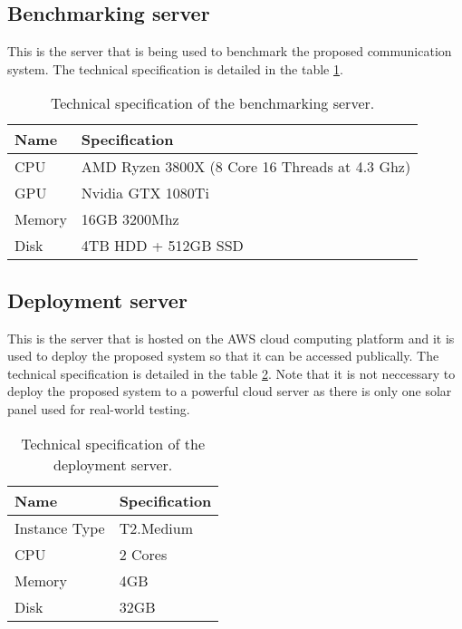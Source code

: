 \documentclass[../thesis.tex]{subfiles}
\begin{document}
\subsection{Benchmarking server}
\label{sec:benchmarkingServer}

This is the server that is being used to benchmark the proposed communication system. The technical specification is detailed in the table \ref{tab:benchmarkingHardware}.

\begin{table}[h!]
	\begin{center}
		\caption{Technical specification of the benchmarking server.}
		\label{tab:benchmarkingHardware}
		\begin{tabular}{l|l}
			\toprule
			\textbf{Name} & \textbf{Specification}\\
			\midrule
			CPU & AMD Ryzen 3800X (8 Core 16 Threads at 4.3 Ghz)\\
			GPU & Nvidia GTX 1080Ti\\
			Memory & 16GB 3200Mhz\\
			Disk & 4TB HDD + 512GB SSD\\
			\bottomrule
		\end{tabular}
	\end{center}
\end{table}

\subsection{Deployment server}

This is the server that is hosted on the AWS cloud computing platform and it is used to deploy the proposed system so that it can be accessed publically. The technical specification is detailed in the table \ref{tab:deploymentHardware}. Note that it is not neccessary to deploy the proposed system to a powerful cloud server as there is only one solar panel used for real-world testing. 

\begin{table}[h!]
	\begin{center}
		\caption{Technical specification of the deployment server.}
		\label{tab:deploymentHardware}
		\begin{tabular}{l|l}
			\toprule
			\textbf{Name} & \textbf{Specification}\\
			\midrule
			Instance Type & T2.Medium\\
			CPU & 2 Cores\\
			Memory & 4GB\\
			Disk & 32GB\\
			\bottomrule
		\end{tabular}
	\end{center}
\end{table}
\end{document}
